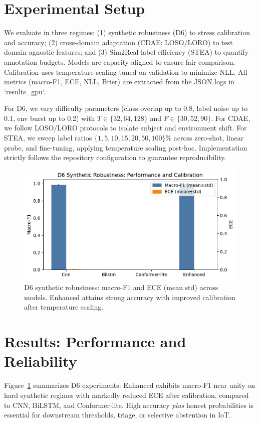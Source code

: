 \documentclass[journal]{IEEEtran}
\begin{document}
\section{Experimental Setup}
We evaluate in three regimes: (1) synthetic robustness (D6) to stress calibration and accuracy; (2) cross-domain adaptation (CDAE: LOSO/LORO) to test domain-agnostic features; and (3) Sim2Real label efficiency (STEA) to quantify annotation budgets. Models are capacity-aligned to ensure fair comparison. Calibration uses temperature scaling tuned on validation to minimize NLL. All metrics (macro-F1, ECE, NLL, Brier) are extracted from the JSON logs in `results\_gpu`.

For D6, we vary difficulty parameters (class overlap up to 0.8, label noise up to 0.1, env burst up to 0.2) with $T\in\{32,64,128\}$ and $F\in\{30,52,90\}$. For CDAE, we follow LOSO/LORO protocols to isolate subject and environment shift. For STEA, we sweep label ratios $\{1,5,10,15,20,50,100\}\%$ across zero-shot, linear probe, and fine-tuning, applying temperature scaling post-hoc. Implementation strictly follows the repository configuration to guarantee reproducibility.

\begin{figure}[t]
\centering
\includegraphics[width=\columnwidth]{plots/d6_calibration_summary.pdf}
\caption{D6 synthetic robustness: macro-F1 and ECE (mean\,\textpm\,std) across models. Enhanced attains strong accuracy with improved calibration after temperature scaling.}
\label{fig:d6_cal}
\end{figure}

\section{Results: Performance and Reliability}
Figure~\ref{fig:d6_cal} summarizes D6 experiments: Enhanced exhibits macro-F1 near unity on hard synthetic regimes with markedly reduced ECE after calibration, compared to CNN, BiLSTM, and Conformer-lite. High accuracy \emph{plus} honest probabilities is essential for downstream thresholds, triage, or selective abstention in IoT.
\end{document}
